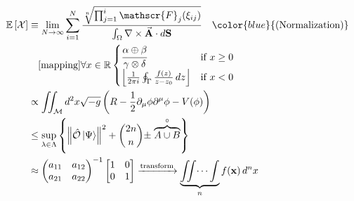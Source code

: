 \begin{align}\mathbb{E}\left[\mathcal{X}\right]&\equiv\lim_{N\to\infty}\sum_{i=1}^{N}\frac{\sqrt[n]{\prod_{j=1}^{i}\mathscr{F}_{j}(\xi_{ij})}}{\int_{\Omega}\nabla\times\vec{\mathbf{A}}\cdot d\mathbf{S}}\quad\color{blue}{\text{(Normalization)}}\\&\quad[\text{mapping}]{\forall x\in\mathbb{R}}\begin{cases}\cfrac{\alpha\oplus\beta}{\gamma\otimes\delta}&\text{if }x\ge0\\\left\lfloor\frac{1}{2\pi i}\oint_{\Gamma}\frac{f(z)}{z-z_{0}}\,dz\right\rfloor&\text{if }x<0\end{cases}\\&\propto\iint_{\mathcal{M}}d^{2}x\sqrt{-g}\left(R-\frac{1}{2}\partial_{\mu}\phi\partial^{\mu}\phi-V(\phi)\right)\\&\le\sup_{\lambda\in\Lambda}\left\{\left\|\hat{\mathcal{O}}\left|\Psi\right\rangle\right\|^{2}+\binom{2n}{n}\pm\stackrel{\circ}{\overbrace{A\cup B}}\right\}\\&\approx\begin{pmatrix}a_{11}&a_{12}\\a_{21}&a_{22}\end{pmatrix}^{-1}\begin{bmatrix}1&0\\0&1\end{bmatrix}\xrightarrow{\text{transform}}\underbrace{\int\!\!\!\int\dots\int}_{n}f(\mathbf{x})\,d^{n}x\end{align}
